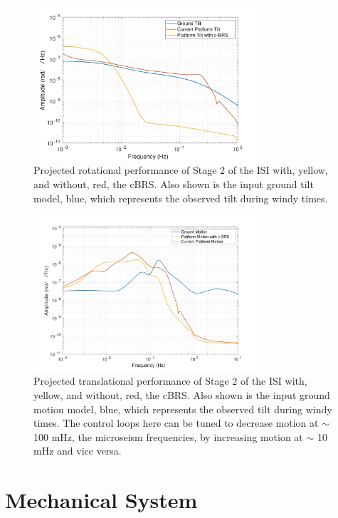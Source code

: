 \documentclass [12pt, proquest]{uwthesis}[2019]
\begin{document}
\begin{figure}%
\begin{center}
\includegraphics[width=0.75\textwidth]{cBRSRotation.pdf}
\caption{Projected rotational performance of Stage 2 of the ISI with, yellow, and without, red, the cBRS. Also shown is the input ground tilt model, blue, which represents the observed tilt during windy times.}
\label{cBRSR}
\end{center}
\end{figure}

\begin{figure}%
\begin{center}
\includegraphics[width=0.75\textwidth]{cBRSTranslation.pdf}
\caption{Projected translational performance of Stage 2 of the ISI with, yellow, and without, red, the cBRS. Also shown is the input ground motion model, blue, which represents the observed tilt during windy times. The control loops here can be tuned to decrease motion at $\sim$ 100 mHz, the microseism frequencies, by increasing motion at $\sim$ 10 mHz and vice versa.}
\label{cBRST}
\end{center}
\end{figure}

\section{Mechanical System}
\end{document}
